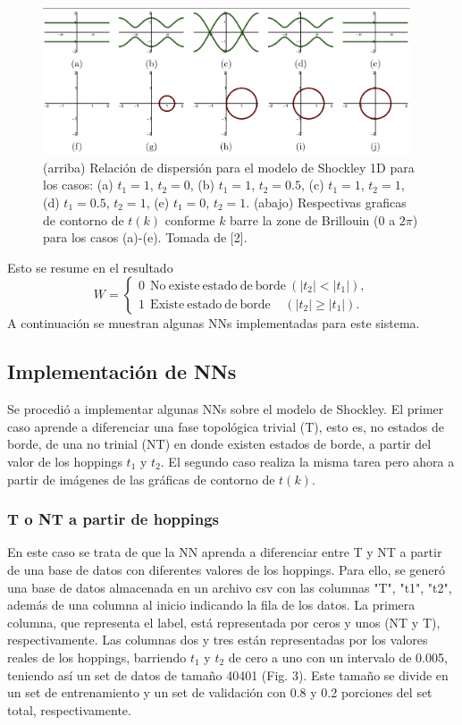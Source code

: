 \documentclass{article}
\begin{document}
\begin{figure}[th!]
   \includegraphics[width=0.97\textwidth]{bandas_shockley.png}
   \caption{(arriba) Relación de dispersión para el modelo de Shockley 1D para los casos: (a) $t_1=1$, $t_2=0$, (b) $t_1=1$, $t_2=0.5$, (c) $t_1=1$, $t_2=1$, (d) $t_1=0.5$, $t_2=1$, (e) $t_1=0$, $t_2=1$. (abajo) Respectivas graficas de contorno de $t(k)$ conforme $k$ barre la zone de Brillouin ($0$ a $2\pi$) para los casos (a)-(e). Tomada de [2].}
\end{figure}

Esto se resume en el resultado
\begin{equation}
    W= \begin{cases} 
0 \ \ \mathrm{No\ existe\ estado\ de\ borde}\ (|t_2|< |t_1|), \\
1 \ \ \mathrm{Existe\ estado\ de\ borde}\ \ \ \ \ (|t_2|\geq |t_1|).
\end{cases}
\end{equation}
A continuación se muestran algunas NNs implementadas para este sistema.

\subsection{Implementación de NNs}
Se procedió a implementar algunas NNs sobre el modelo de Shockley. El primer caso aprende a diferenciar una fase topológica trivial (T), esto es, no estados de borde, de una no trinial (NT) en donde existen estados de borde, a partir del valor de los hoppings $t_1$ y $t_2$. El segundo caso realiza la misma tarea pero ahora a partir de imágenes de las gráficas de contorno de $t(k)$.

\subsubsection{T o NT a partir de hoppings}
En este caso se trata de que la NN aprenda a diferenciar entre T y NT a partir de una base de datos con diferentes valores de los hoppings. Para ello, se generó una base de datos almacenada en un archivo csv con las columnas "T", "t1", "t2", además de una columna al inicio indicando la fila de los datos. La primera columna, que representa el label, está representada por ceros y unos (NT y T), respectivamente. Las columnas dos y tres están representadas por los valores reales de los hoppings, barriendo $t_1$ y $t_2$ de cero a uno con un intervalo de 0.005, teniendo así un set de datos de tamaño 40401  (Fig. 3). Este tamaño se divide en un set de entrenamiento y un set de validación con 0.8 y 0.2 porciones del set total, respectivamente.  
\end{document}

